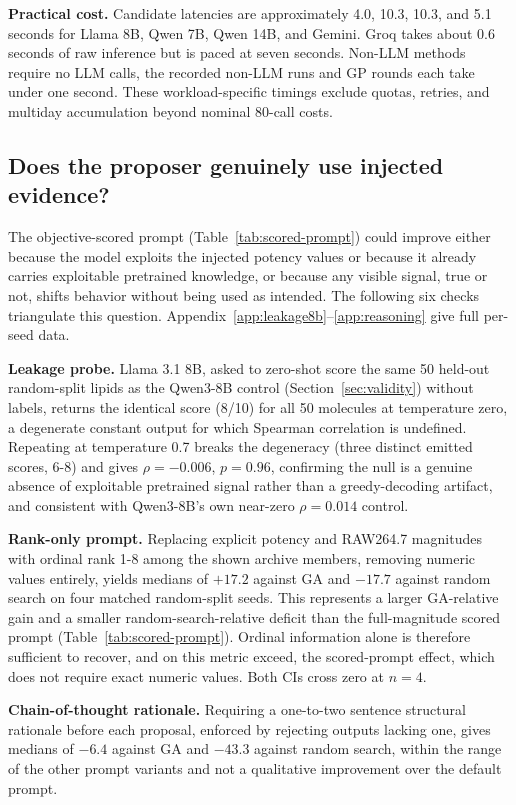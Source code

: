 \documentclass[11pt]{article}
\begin{document}
\textbf{Practical cost.} Candidate latencies are approximately 4.0, 10.3, 10.3, and 5.1 seconds for Llama 8B, Qwen 7B, Qwen 14B, and Gemini. Groq takes about 0.6 seconds of raw inference but is paced at seven seconds. Non-LLM methods require no LLM calls, the recorded non-LLM runs and GP rounds each take under one second. These workload-specific timings exclude quotas, retries, and multiday accumulation beyond nominal 80-call costs.

\subsection{Does the proposer genuinely use injected evidence?}
\label{sec:evidence}
The objective-scored prompt (Table~\ref{tab:scored-prompt}) could improve either because the model exploits the injected potency values or because it already carries exploitable pretrained knowledge, or because any visible signal, true or not, shifts behavior without being used as intended. The following six checks triangulate this question. Appendix~\ref{app:leakage8b}--\ref{app:reasoning} give full per-seed data.

\textbf{Leakage probe.} Llama 3.1 8B, asked to zero-shot score the same 50 held-out random-split lipids as the Qwen3-8B control (Section~\ref{sec:validity}) without labels, returns the identical score (8/10) for all 50 molecules at temperature zero, a degenerate constant output for which Spearman correlation is undefined. Repeating at temperature 0.7 breaks the degeneracy (three distinct emitted scores, 6-8) and gives $\rho=-0.006$, $p=0.96$, confirming the null is a genuine absence of exploitable pretrained signal rather than a greedy-decoding artifact, and consistent with Qwen3-8B's own near-zero $\rho=0.014$ control.

\textbf{Rank-only prompt.} Replacing explicit potency and RAW264.7 magnitudes with ordinal rank 1-8 among the shown archive members, removing numeric values entirely, yields medians of $+17.2$ against GA and $-17.7$ against random search on four matched random-split seeds. This represents a larger GA-relative gain and a smaller random-search-relative deficit than the full-magnitude scored prompt (Table~\ref{tab:scored-prompt}). Ordinal information alone is therefore sufficient to recover, and on this metric exceed, the scored-prompt effect, which does not require exact numeric values. Both CIs cross zero at $n=4$.

\textbf{Chain-of-thought rationale.} Requiring a one-to-two sentence structural rationale before each proposal, enforced by rejecting outputs lacking one, gives medians of $-6.4$ against GA and $-43.3$ against random search, within the range of the other prompt variants and not a qualitative improvement over the default prompt.
\end{document}

